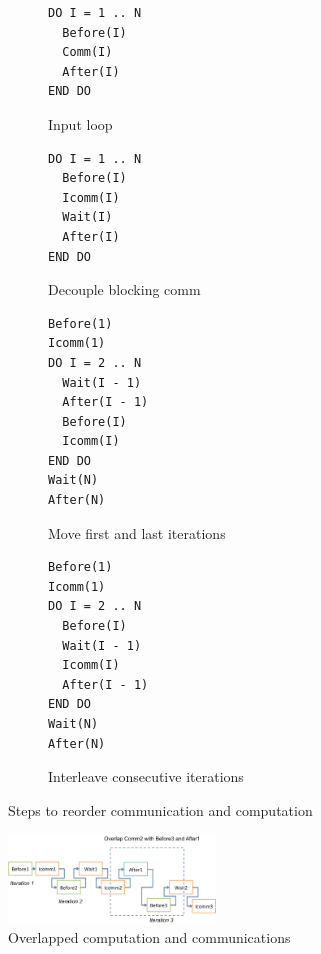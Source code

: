 \begin{figure}
{\scriptsize
  \centering
  \begin{subfigure}[b]{.25\textwidth}
\begin{verbatim}
DO I = 1 .. N
  Before(I)
  Comm(I)
  After(I)
END DO
\end{verbatim}
\vspace{-.1in}
    \caption{Input loop}
    \label{fig:cco:reorder:a}
    \vspace{.1in}
  \end{subfigure}
  \begin{subfigure}[b]{.25\textwidth}
\begin{verbatim}
DO I = 1 .. N
  Before(I)
  Icomm(I)
  Wait(I)
  After(I)
END DO
\end{verbatim}
\vspace{-.1in}
    \caption{Decouple blocking comm}
    \label{fig:cco:reorder:b}
    \vspace{.1in}
  \end{subfigure}
  \begin{subfigure}[b]{.25\textwidth}
\begin{verbatim}
Before(1)
Icomm(1)
DO I = 2 .. N
  Wait(I - 1)
  After(I - 1)
  Before(I)
  Icomm(I)
END DO
Wait(N)
After(N)
\end{verbatim}
\vspace{-.1in}
    \caption{Move first and last iterations}
    \label{fig:cco:reorder:c}
    \vspace{.1in}
  \end{subfigure}
  \begin{subfigure}[b]{.25\textwidth}
\begin{verbatim}
Before(1)
Icomm(1)
DO I = 2 .. N
  Before(I)
  Wait(I - 1)
  Icomm(I)
  After(I - 1)
END DO
Wait(N)
After(N)
\end{verbatim}
\vspace{-.1in}
    \caption{Interleave consecutive iterations}
    \label{fig:cco:reorder:d}
  \end{subfigure}
\caption{Steps to reorder communication and computation}
\label{fig:cco:reorder}
}
\end{figure}

\begin{figure}[h]
\centering
\includegraphics[width=0.49\textwidth]{fig/ft_shift.png}
\caption{Overlapped computation and communications}
\label{fig:cco:shift}
\end{figure}

